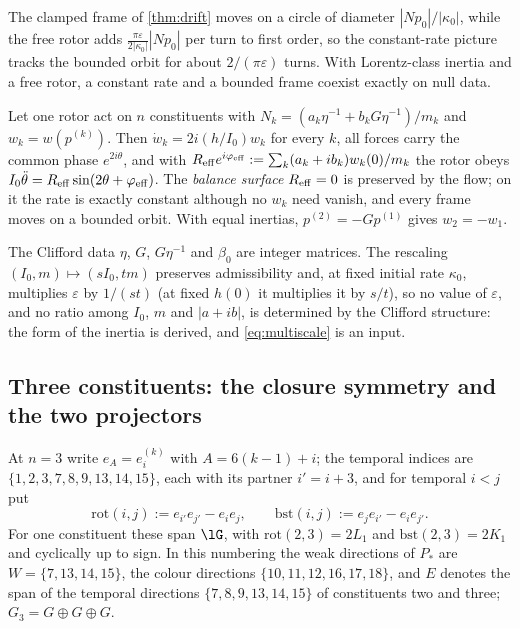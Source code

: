 The clamped frame of \cref{thm:drift} moves on a circle of diameter $|Np_0|/|\kappa_0|$, while the free rotor adds $\tfrac{\pi\varepsilon}{2|\kappa_0|}|Np_0|$
per turn to first order, so the constant-rate picture tracks the bounded orbit for about $2/(\pi\varepsilon)$ turns. With Lorentz-class inertia and a
free rotor, a constant rate and a bounded frame coexist exactly on null data.

\begin{proposition}
\label{prop:several}
Let one rotor act on $n$ constituents with $N_k=(a_k\eta^{-1}+b_kG\eta^{-1})/m_k$ and $w_k=w(p^{(k)})$. Then $\dot w_k=2i(h/I_0)w_k$ for every $k$, all
forces carry the common phase $e^{2i\theta}$, and with $R_{\rm eff}e^{i\varphi_{\rm eff}}:=\sum_k(a_k+ib_k)w_k(0)/m_k$ the rotor obeys
$I_0\ddot\theta=R_{\rm eff}\sin(2\theta+\varphi_{\rm eff})$. The \emph{balance surface} $R_{\rm eff}=0$ is preserved by the flow; on it the rate is exactly
constant although no $w_k$ need vanish, and every frame moves on a bounded orbit. With equal inertias, $p^{(2)}=-Gp^{(1)}$ gives $w_2=-w_1$.
\end{proposition}

The Clifford data $\eta$, $G$, $G\eta^{-1}$ and $\beta_0$ are integer matrices. The rescaling $(I_0,m)\mapsto(sI_0,tm)$ preserves admissibility and,
at fixed initial rate $\kappa_0$, multiplies $\varepsilon$ by $1/(st)$ (at fixed $h(0)$ it multiplies it by $s/t$), so no value of $\varepsilon$, and no ratio among $I_0$, $m$ and $|a+ib|$, is determined by the Clifford structure:
the form of the inertia is derived, and \eqref{eq:multiscale} is an input.

\subsection{Three constituents: the closure symmetry and the two projectors}

At $n=3$ write $e_A=e^{(k)}_i$ with $A=6(k-1)+i$; the temporal indices are $\{1,2,3,7,8,9,13,14,15\}$, each with its partner $i'=i+3$, and for
temporal $i<j$ put
\[
\mathrm{rot}(i,j):=e_{i'}e_{j'}-e_ie_j,\qquad \mathrm{bst}(i,j):=e_je_{i'}-e_ie_{j'} .
\]
For one constituent these span $\lG$, with $\mathrm{rot}(2,3)=2L_1$ and $\mathrm{bst}(2,3)=2K_1$ and cyclically up to sign. In this numbering the
weak directions of $P_*$ are $W=\{7,13,14,15\}$, the colour directions $\{10,11,12,16,17,18\}$, and $E$ denotes the span of the temporal directions
$\{7,8,9,13,14,15\}$ of constituents two and three; $G_3=G\oplus G\oplus G$.


